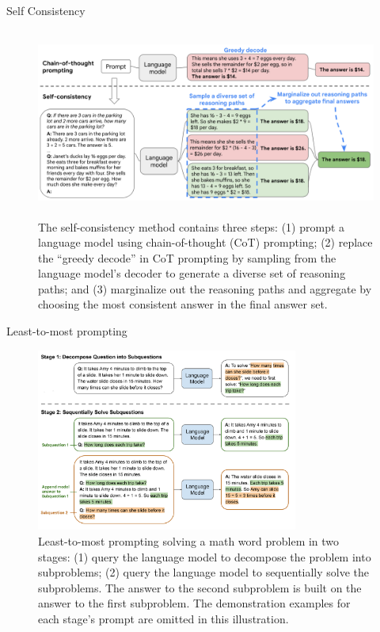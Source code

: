 \documentclass[aspectratio=1610,xcolor={dvipsnames},hyperref={colorlinks,unicode,linkcolor=violet,anchorcolor=BlueViolet,citecolor=YellowOrange,filecolor=black,urlcolor=Aquamarine}]{beamer}
\begin{document}
\begin{frame}[label={sec:org9f743c1}]{Self Consistency }
\begin{figure}[htbp]
\centering
\includegraphics[height=6.2cm]{./p7.png}
\caption{\label{fig:org4674144}\tiny The self-consistency method contains three steps: (1) prompt a language model using chain-of-thought (CoT) prompting; (2) replace the “greedy decode” in CoT prompting by sampling from the language model’s decoder to generate a diverse set of reasoning paths; and (3) marginalize out the reasoning paths and aggregate by choosing the most consistent answer in the final answer set.}
\end{figure}
\end{frame}

\begin{frame}[label={sec:orgf2d17ed}]{Least-to-most prompting }
\begin{figure}[htbp]
\centering
\includegraphics[height=6cm]{./p8.png}
\caption{\label{fig:orgef22c12}\tiny Least-to-most prompting solving a math word problem in two stages: (1) query the language model to decompose the problem into subproblems; (2) query the language model to sequentially solve the subproblems. The answer to the second subproblem is built on the answer to the first subproblem. The demonstration examples for each stage’s prompt are omitted in this illustration.}
\end{figure}
\end{frame}
\end{document}
